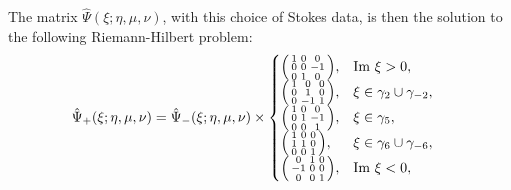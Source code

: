 \documentclass[usenames,dvipsnames]{article}
\theoremstyle{definition}
\numberwithin{equation}{section}
\numberwithin{figure}{section}
\begin{document}
The matrix $\hat{\Psi}(\xi;\eta,\mu,\nu)$, with this choice of Stokes data, is then the solution to the following Riemann-Hilbert problem:
    \begin{align}
        \hat{\Psi}_+(\xi;\eta,\mu,\nu) &= \hat{\Psi}_-(\xi;\eta,\mu,\nu)\times
            \begin{cases}
                    \begin{psmallmatrix}
                       1 & 0 & 0\\
                       0 & 0 & -1\\
                       0 & 1 & 0\\
                   \end{psmallmatrix}, & \text{Im }\xi > 0,\\
                    \begin{psmallmatrix}
                       1 & 0 & 0\\
                       0 & 1 & 0\\
                       0 & -1 & 1\\
                   \end{psmallmatrix}, & \xi \in \gamma_{2} \cup \gamma_{-2},\\
                    \begin{psmallmatrix}
                       1 & 0 & 0\\
                       0 & 1 & -1\\
                       0 & 0 & 1\\
                   \end{psmallmatrix}, & \xi \in \gamma_{5},\\
                    \begin{psmallmatrix}
                       1 & 0 & 0\\
                       1 & 1 & 0\\
                       0 & 0 & 1\\
                   \end{psmallmatrix}, &\xi \in \gamma_{6}  \cup \gamma_{-6},\\
                    \begin{psmallmatrix}
                       0 & 1 & 0\\
                       -1 & 0 & 0\\
                       0 & 0 & 1\\
                   \end{psmallmatrix}, & \text{Im }\xi < 0,\\

\end{cases}
\end{align}
\end{document}
